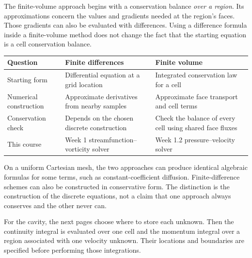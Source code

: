 The finite-volume approach begins with a conservation balance \emph{over a
region}. Its approximations concern the values and gradients needed at the
region's faces. Those gradients can also be evaluated with differences.
Using a difference formula inside a finite-volume method does not change
the fact that the starting equation is a cell conservation balance.

\begin{center}\begin{tabular}{>{\raggedright\arraybackslash}p{.22\linewidth}>{\raggedright\arraybackslash}p{.33\linewidth}>{\raggedright\arraybackslash}p{.33\linewidth}}\toprule
Question & Finite differences & Finite volume\\\midrule
Starting form & Differential equation at a grid location & Integrated conservation law for a cell\\
Numerical construction & Approximate derivatives from nearby samples & Approximate face transport and cell terms\\
Conservation check & Depends on the chosen discrete construction & Check the balance of every cell using shared face fluxes\\
This course & Week 1 streamfunction--vorticity solver & Week 1.2 pressure--velocity solver\\\bottomrule
\end{tabular}\end{center}
On a uniform Cartesian mesh, the two approaches can produce identical
algebraic formulas for some terms, such as constant-coefficient diffusion.
Finite-difference schemes can also be constructed in conservative form.
The distinction is the construction of the discrete equations, not a claim
that one approach always conserves and the other never can.

For the cavity, the next pages choose where to store each unknown. Then the
continuity integral is evaluated over one cell and the momentum integral over
a region associated with one velocity unknown. Their locations and boundaries
are specified before performing those integrations.
